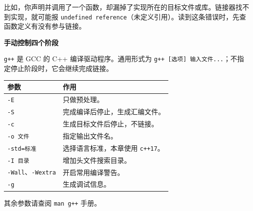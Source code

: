 比如，你声明并调用了一个函数，却漏掉了实现所在的目标文件或库。链接器找不到实现，就可能报
\texttt{undefined reference}（未定义引用）。读到这条错误时，先查函数定义有没有参与链接。

\textbf{手动控制四个阶段}

\texttt{g++} 是 GCC 的 C++ 编译驱动程序。通用形式为 \texttt{g++ [选项] 输入文件...}；不指定停止阶段时，它会继续完成链接。
\begin{center}
\begin{tabular}{p{}p{}}
\toprule[1.5pt]
参数 & 作用 \\
\midrule[1pt]
\texttt{-E} & 只做预处理。\\
\texttt{-S} & 完成编译后停止，生成汇编文件。\\
\texttt{-c} & 生成目标文件后停止，不链接。\\
\texttt{-o 文件} & 指定输出文件名。\\
\texttt{-std=标准} & 选择语言标准，本章使用 \texttt{c++17}。\\
\texttt{-I 目录} & 增加头文件搜索目录。\\
\texttt{-Wall}、\texttt{-Wextra} & 开启常用编译警告。\\
\texttt{-g} & 生成调试信息。\\
\bottomrule[1.5pt]
\end{tabular}
\end{center}
其余参数请查阅 \texttt{man g++} 手册。

